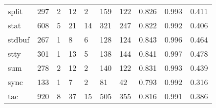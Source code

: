 \begin{longtable}{lp{2.0cm}p{2.0cm}p{2.0cm}p{2.0cm}p{2.0cm}p{2.0cm}p{2.0cm}p{2.0cm}p{2.0cm}}
split     &                    297 &                                  2 &                                12 &                                2 &                               159 &                             122 &                                   0.826 &                                  0.993 &                                0.411 \\
stat      &                    608 &                                  5 &                                21 &                               14 &                               321 &                             247 &                                   0.822 &                                  0.992 &                                0.406 \\
stdbuf    &                    267 &                                  1 &                                 8 &                                6 &                               128 &                             124 &                                   0.843 &                                  0.996 &                                0.464 \\
stty      &                    301 &                                  1 &                                13 &                                5 &                               138 &                             144 &                                   0.841 &                                  0.997 &                                0.478 \\
sum       &                    278 &                                  2 &                                12 &                                2 &                               140 &                             122 &                                   0.831 &                                  0.993 &                                0.439 \\
sync      &                    133 &                                  1 &                                 7 &                                2 &                                81 &                              42 &                                   0.793 &                                  0.992 &                                0.316 \\
tac       &                    920 &                                  8 &                                37 &                               15 &                               505 &                             355 &                                   0.816 &                                  0.991 &                                0.386 \\

\end{longtable}
